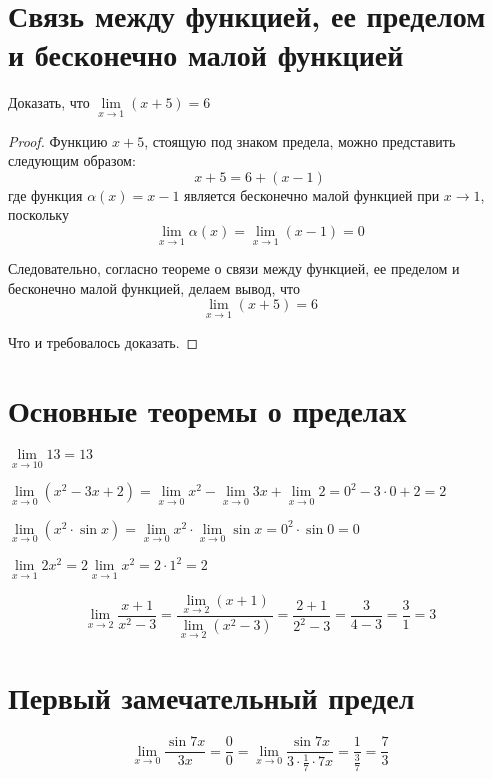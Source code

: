 \documentclass[14pt]{extreport}
\begin{document}
\section{Связь между функцией, ее пределом и бесконечно малой функцией}
\begin{example}Доказать, что $\lim\limits_{x\to1}(x+5)=6$
\begin{proof}
Функцию $x+5$, стоящую под знаком предела, можно представить следующим образом:
$$x+5=6+(x-1)$$
где функция $\alpha(x)=x-1$ является бесконечно малой функцией при $x\rightarrow1$, поскольку 
$$\lim\limits_{x\to1}\alpha(x)=\lim\limits_{x\to1}(x-1)=0$$

Следовательно, согласно теореме о связи между функцией, ее пределом и бесконечно малой функцией, делаем вывод, что 
$$\lim\limits_{x\to 1}(x+5)=6$$

Что и требовалось доказать.

\end{proof}

\end{example}

\section{Основные теоремы о пределах}
\begin{example}
$\lim\limits_{x\to 10}13=13$
\end{example}

\begin{example}
$\lim\limits_{x\to 0}(x^2-3x+2)=\lim\limits_{x\to 0}x^2-\lim\limits_{x\to 0}3x+\lim\limits_{x\to 0}2=0^2-3\cdot0+2=2$	
\end{example}

\begin{example}
$\lim\limits_{x\to 0}(x^2\cdot \sin x)= \lim\limits_{x\to 0}x^2\cdot\lim\limits_{x \to 0}\sin x =0^2\cdot\sin 0=0$
\end{example}

\begin{example}
$\lim\limits_{x\to 1}2x^2=2\lim\limits_{x\to 1}x^2=2\cdot 1^2=2$
\end{example}

\begin{example}
$$\lim\limits_{x\to 2}\frac{x+1}{x^2-3}=\frac{\lim\limits_{x\to 2}(x+1)}{\lim\limits_{x\to 2}(x^2-3)}=\frac{2+1}{2^2-3}=\frac{3}{4-3}=\frac{3}{1}=3$$
\end{example}


\section{Первый замечательный предел}
\begin{example}
 $$\lim\limits_{x\to 0}\frac{\sin7x}{3x}=\frac{0}{0}=\lim\limits_{x\to 0}\frac{\sin7x}{3\cdot\frac{1}{7}\cdot7x}=\frac{1}{\frac{3}{7}}=\frac{7}{3}$$
\end{example}
\end{document}
